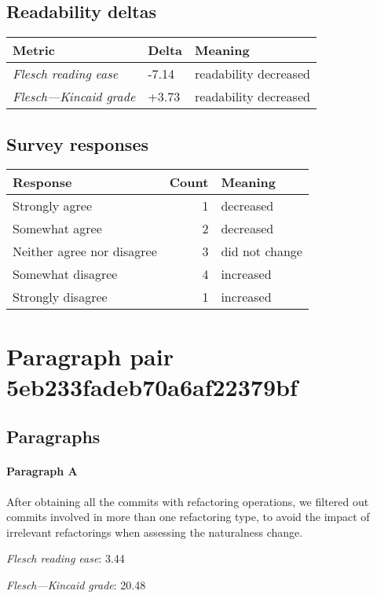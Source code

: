 \subsection{Readability deltas}

\begin{tabular}{lll}
\toprule
               \textbf{Metric} & \textbf{Delta} &       \textbf{Meaning} \\
\midrule
    \emph{Flesch reading ease} &          -7.14 &  readability decreased \\
 \emph{Flesch---Kincaid grade} &          +3.73 &  readability decreased \\
\bottomrule
\end{tabular}

\subsection{Survey responses}
\begin{tabular}{lrl}
\toprule
          \textbf{Response} &  \textbf{Count} & \textbf{Meaning} \\
\midrule
             Strongly agree &               1 &        decreased \\
             Somewhat agree &               2 &        decreased \\
 Neither agree nor disagree &               3 &   did not change \\
          Somewhat disagree &               4 &        increased \\
          Strongly disagree &               1 &        increased \\
\bottomrule
\end{tabular}

\section{Paragraph pair 5eb233fadeb70a6af22379bf}
\subsection{Paragraphs}
\paragraph{Paragraph A}
After obtaining all the commits with refactoring operations, we filtered out commits involved in more than one refactoring type, to avoid the impact of irrelevant refactorings when assessing the naturalness change.\par\medskip
\emph{Flesch reading ease}: 3.44\par
\emph{Flesch---Kincaid grade}: 20.48


